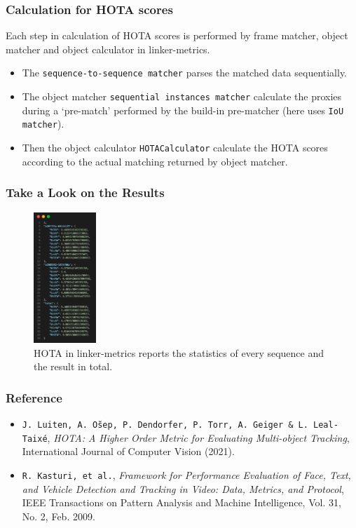 \documentclass[slidetop, mathserif]{beamer}
\begin{document}
\begin{frame}
	\frametitle{Calculation for HOTA scores}

	Each step in calculation of HOTA scores is performed by frame matcher, object matcher
	and object calculator in linker-metrics.

	\begin{itemize}
	\item The {\tt sequence-to-sequence matcher} parses the matched data sequentially.

	\item The object matcher {\tt sequential instances matcher} calculate the proxies
		during a `pre-match' performed by the build-in pre-matcher (here uses {\tt IoU matcher}).

	\item Then the object calculator {\tt HOTACalculator} calculate the HOTA scores
		according to the actual matching returned by object matcher.
	\end{itemize}

\end{frame}

\begin{frame}
	\frametitle{Take a Look on the Results}
	\begin{figure}
		\includegraphics[height=140pt]{pics/fig15.png}
		\caption{HOTA in linker-metrics reports the statistics of every sequence and the result in total.}
	\end{figure}
\end{frame}

\begin{frame}
	\frametitle{Reference}

	\small

	\begin{itemize}
	\item {\tt J. Luiten, A. O\u{s}ep, P. Dendorfer, P. Torr, A. Geiger \& L. Leal-Taix\'e},
		\emph{HOTA: A Higher Order Metric for Evaluating Multi-object Tracking}, International Journal of Computer Vision (2021).
	\item {\tt R. Kasturi, et al.},
		\emph{Framework for Performance Evaluation of Face, Text, and Vehicle Detection and Tracking in Video:
		Data, Metrics, and Protocol}, IEEE Transactions on Pattern Analysis and Machine Intelligence,
		Vol. 31, No. 2, Feb. 2009.
	\end{itemize}
\end{frame}
\end{document}
